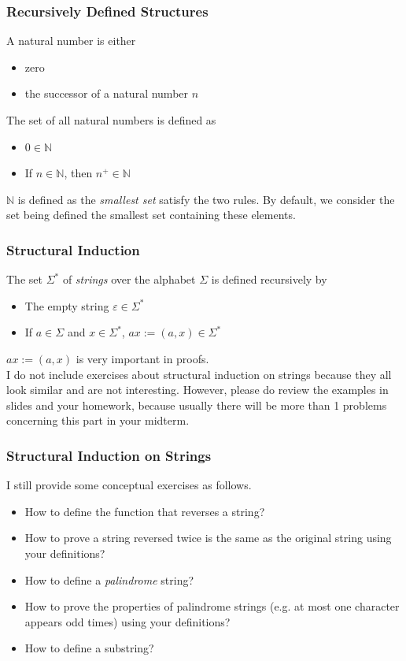 \documentclass[aspectratio=169]{beamer}
\begin{document}
\begin{frame}
  \frametitle{Recursively Defined Structures}
  A natural number is either
  \begin{itemize}
    \item zero
    \item the successor of a natural number $n$
  \end{itemize}
  \vspace*{12pt}
  The set of all natural numbers is defined as
  \begin{itemize}
    \item $0\in\mathbb{N}$
    \item If $n\in\mathbb{N}$, then $n^+ \in \mathbb{N}$
  \end{itemize}
  $\mathbb{N}$ is defined as the \textit{smallest set} satisfy the two rules. By default, we consider
  the set being defined the smallest set containing these elements.
\end{frame}
\begin{frame}
  \frametitle{Structural Induction}
  The set $\Sigma^*$ of \textit{strings} over the alphabet $\Sigma$ is defined recursively by
  \begin{itemize}
    \item The empty string $\varepsilon \in \Sigma^*$
    \item If $a\in\Sigma$ and $x\in\Sigma^*$, $ax:=\left(a, x\right)\in\Sigma^*$
  \end{itemize}
  $ax := \left(a, x\right)$ is very important in proofs. \\[12pt]
  I do not include exercises about structural induction on strings because they all look similar and are not interesting. However, 
  please do review the examples in slides and your homework, because usually there will be more than 1 problems
  concerning this part in your midterm. 
\end{frame}
\begin{frame}
\frametitle{Structural Induction on Strings}
  I still provide some conceptual exercises as follows.
  \begin{itemize}
    \item How to define the function that reverses a string?
    \item How to prove a string reversed twice is the same as the original string using your definitions?
    \item How to define a \textit{palindrome} string?
    \item How to prove the properties of palindrome strings (e.g. at most one character appears odd times) using your definitions? 
    \item How to define a substring?
  \end{itemize}
\end{frame}
\end{document}

